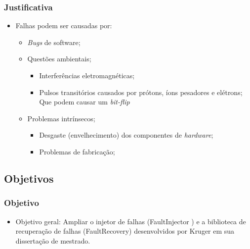 \begin{frame}
	\frametitle{Justificativa}
	\begin{itemize}		
		\item Falhas podem ser causadas por:
		\begin{itemize}
			\item \textit{Bugs} de software;
			
			\item Questões ambientais;
			\begin{itemize}
				\item Interferências eletromagnéticas;
				\item Pulsos transitórios causados por prótons, íons pesadores e elétrons; Que podem causar um \textit{bit-flip}
			\end{itemize}			
			\item Problemas intrínsecos;
			\begin{itemize}
				\item Desgaste (envelhecimento) dos componentes de \textit{hardware};				
				\item Problemas de fabricação;
			\end{itemize}
		\end{itemize}
	\end{itemize}
\end{frame}

\subsection{Objetivos}

\begin{frame}
	\frametitle{Objetivo}
	\begin{itemize}
		\item Objetivo geral: Ampliar o injetor de falhas (FaultInjector ) e a biblioteca de recuperação de falhas (FaultRecovery) desenvolvidos por Kruger em sua dissertação
		de mestrado.
	\end{itemize}
\end{frame}

